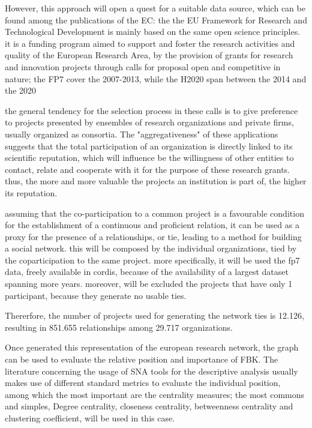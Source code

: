 However, this approach will open a quest for a suitable data source, which can be found among the publications of the EC: the the EU Framework for Research and Technological Development is mainly based on the same open science principles. it is a funding program aimed to support and foster the research activities and quality of the European Research Area, by the provision of grants for research and innovation projects through calls for proposal open and competitive in nature; the FP7 cover the 2007-2013, while the H2020 span between the 2014 and the 2020

the general tendency for the selection process in these calls is to give preference to projects presented by ensembles of research organizations and private firms, usually organized as consortia. The "aggregativeness" of these applications suggests that the total participation of an organization is directly linked to its scientific reputation, which will influence be the willingness of other entities to contact, relate and cooperate with it for the purpose of these research grants. thus, the more and more valuable the projects an institution is part of, the higher its reputation.

assuming that the co-participation to a common project is a favourable condition for the establishment of a continuous and proficient relation, it can be used as a proxy for the presence of a relationships, or tie, leading to a method for building a social network. this will be composed by the individual organizations, tied by the coparticipation to the same project. more specifically, it will be used the fp7 data, freely available in cordis, because of the availability of a largest dataset spanning more years. moreover, will be excluded the projects that have only 1 participant, because they generate no usable ties.

Thererfore, the number of projects used for generating the network ties is 12.126, resulting in 851.655 relationships among 29.717 organizations. 

Once generated this representation of the european research network, the graph can be used to evaluate the relative position and importance of FBK. The literature concerning the usage of SNA tools for the descriptive analysis usually makes use of different standard metrics to evaluate the individual position, among which the most important are the centrality measures; the most commons and simples, Degree centrality, closeness centrality, betweenness centrality and clustering coefficient, will be used in this case.

